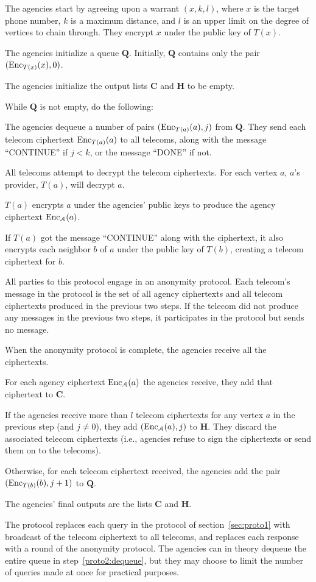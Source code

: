 \bce
\item The agencies start by agreeing upon a warrant $(x, k, l)$, where $x$ is the target phone number, $k$ is a maximum distance, and $l$ is an upper limit on the degree of vertices to chain through. They encrypt $x$ under the public key of $T(x)$.
\item The agencies initialize a queue $\mathbf{Q}$. Initially, $\mathbf{Q}$ contains only the pair $(\operatorname{Enc}_{T(x)}(x), 0)$.
\item The agencies initialize the output lists $\mathbf{C}$ and $\mathbf{H}$ to be empty.
\item While $\mathbf{Q}$ is not empty, do the following:
\bce
\item \label{proto2:dequeue} The agencies dequeue a number of pairs $(\operatorname{Enc}_{T(a)}(a), j)$ from $\mathbf{Q}$. They send each telecom ciphertext $\operatorname{Enc}_{T(a)}(a)$ to all telecoms, along with the message ``CONTINUE'' if $j<k$, or the message ``DONE'' if not.
\item All telecoms attempt to decrypt the telecom ciphertexts. For each vertex $a$, $a$'s provider, $T(a)$, will decrypt $a$. 
\item $T(a)$ encrypts $a$ under the agencies' public keys to produce the agency ciphertext $\operatorname{Enc}_\mathcal{A}(a)$.
\item If $T(a)$ got the message ``CONTINUE'' along with the ciphertext, it also encrypts each neighbor $b$ of $a$ under the public key of $T(b)$, creating a telecom ciphertext for $b$.
\item All parties to this protocol engage in an anonymity protocol. Each telecom's message in the protocol is the set of all agency ciphertexts and all telecom ciphertexts produced in the previous two steps. If the telecom did not produce any messages in the previous two steps, it participates in the protocol but sends no message.
\item When the anonymity protocol is complete, the agencies receive all the ciphertexts.
\item For each agency ciphertext $\operatorname{Enc}_\mathcal{A}(a)$ the agencies receive, they add that ciphertext to $\mathbf{C}$.
\item If the agencies receive more than $l$ telecom ciphertexts for any vertex $a$ in the previous step (and $j\neq 0$), they add $(\operatorname{Enc}_\mathcal{A}(a), j)$ to $\mathbf{H}$. They discard the associated telecom ciphertexts (i.e., agencies refuse to sign the ciphertexts or send them on to the telecoms).
\item Otherwise, for each telecom ciphertext received, the agencies add the pair $(\operatorname{Enc}_{T(b)}(b), j+1)$ to $\mathbf{Q}$.
\ece
\item The agencies' final outputs are the lists $\mathbf{C}$ and $\mathbf{H}$.
\ece

The protocol replaces each query in the protocol of section~\ref{sec:proto1} with broadcast of the telecom ciphertext to all telecoms, and replaces each response with a round of the anonymity protocol. The agencies can in theory dequeue the entire queue in step~\ref{proto2:dequeue}, but they may choose to limit the number of queries made at once for practical purposes.